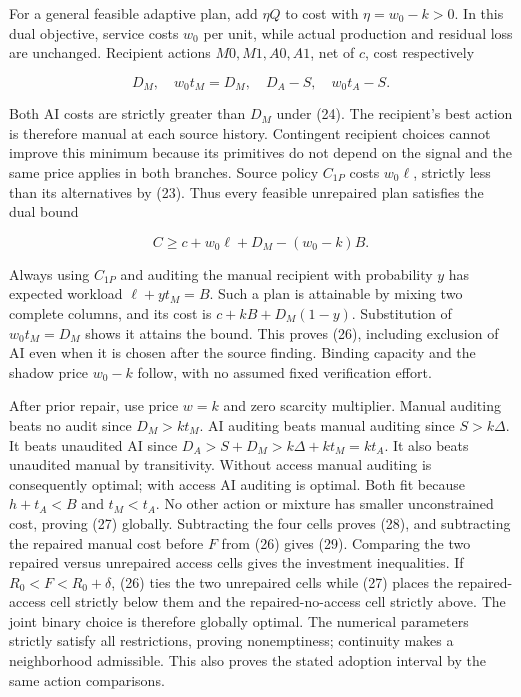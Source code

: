 \documentclass[
  11pt,
  a4paper,
]{article}
\begin{document}
For a general feasible adaptive plan, add \(\eta Q\) to cost with
\(\eta=w_0-k>0\). In this dual objective, service costs \(w_0\) per
unit, while actual production and residual loss are unchanged. Recipient
actions \(M0,M1,A0,A1\), net of \(c\), cost respectively

\[D_M,\quad w_0t_M=D_M,\quad D_A-S,\quad w_0t_A-S.\]

Both AI costs are strictly greater than \(D_M\) under (24). The
recipient's best action is therefore manual at each source history.
Contingent recipient choices cannot improve this minimum because its
primitives do not depend on the signal and the same price applies in
both branches. Source policy \(C_{1P}\) costs \(w_0\ell\), strictly less
than its alternatives by (23). Thus every feasible unrepaired plan
satisfies the dual bound

\[C\geq c+w_0\ell+D_M-(w_0-k)B.\]

Always using \(C_{1P}\) and auditing the manual recipient with
probability \(y\) has expected workload \(\ell+y t_M=B\). Such a plan is
attainable by mixing two complete columns, and its cost is
\(c+kB+D_M(1-y)\). Substitution of \(w_0t_M=D_M\) shows it attains the
bound. This proves (26), including exclusion of AI even when it is
chosen after the source finding. Binding capacity and the shadow price
\(w_0-k\) follow, with no assumed fixed verification effort.

After prior repair, use price \(w=k\) and zero scarcity multiplier.
Manual auditing beats no audit since \(D_M>kt_M\). AI auditing beats
manual auditing since \(S>k\Delta\). It beats unaudited AI since
\(D_A>S+D_M>k\Delta+kt_M=kt_A\). It also beats unaudited manual by
transitivity. Without access manual auditing is consequently optimal;
with access AI auditing is optimal. Both fit because \(h+t_A<B\) and
\(t_M<t_A\). No other action or mixture has smaller unconstrained cost,
proving (27) globally. Subtracting the four cells proves (28), and
subtracting the repaired manual cost before \(F\) from (26) gives (29).
Comparing the two repaired versus unrepaired access cells gives the
investment inequalities. If \(R_0<F<R_0+\delta\), (26) ties the two
unrepaired cells while (27) places the repaired-access cell strictly
below them and the repaired-no-access cell strictly above. The joint
binary choice is therefore globally optimal. The numerical parameters
strictly satisfy all restrictions, proving nonemptiness; continuity
makes a neighborhood admissible. This also proves the stated adoption
interval by the same action comparisons.
\end{document}
